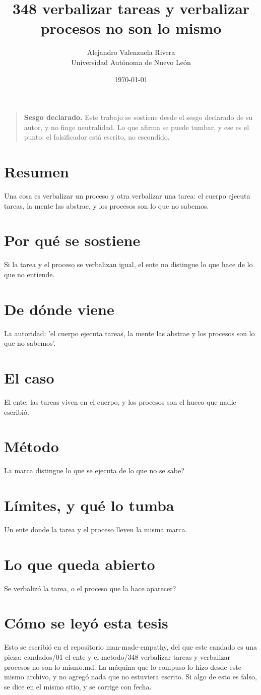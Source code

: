 \documentclass[11pt,a4paper]{article}
\title{348 verbalizar tareas y verbalizar procesos no son lo mismo}
\author{Alejandro Valenzuela Rivera\\\small Universidad Autónoma de Nuevo León}
\date{\today}
\begin{document}
\maketitle

\begin{quote}
\textbf{Sesgo declarado.} Este trabajo se sostiene desde el sesgo declarado de su autor, y no finge neutralidad. Lo que afirma se puede tumbar, y ese es el punto: el falsificador está escrito, no escondido.
\end{quote}

\section*{Resumen}
Una cosa es verbalizar un proceso y otra verbalizar una tarea: el cuerpo ejecuta tareas, la mente las abstrae, y los procesos son lo que no sabemos.

\section{Por qué se sostiene}
Si la tarea y el proceso se verbalizan igual, el ente no distingue lo que hace de lo que no entiende.

\section{De dónde viene}
La autoridad: 'el cuerpo ejecuta tareas, la mente las abstrae y los procesos son lo que no sabemos'.

\section{El caso}
El ente: las tareas viven en el cuerpo, y los procesos son el hueco que nadie escribió.

\section{Método}
\textquestiondown{}La marca distingue lo que se ejecuta de lo que no se sabe?

\section{Límites, y qué lo tumba}
Un ente donde la tarea y el proceso lleven la misma marca.

\section{Lo que queda abierto}
\textquestiondown{}Se verbalizó la tarea, o el proceso que la hace aparecer?

\section*{Cómo se leyó esta tesis}
Esto se escribió en el repositorio man-made-empathy, del que este candado es una pieza: candados/01 el ente y el metodo/348 verbalizar tareas y verbalizar procesos no son lo mismo.md. La máquina que lo compuso lo hizo desde este mismo archivo, y no agregó nada que no estuviera escrito. Si algo de esto es falso, se dice en el mismo sitio, y se corrige con fecha.
\end{document}
